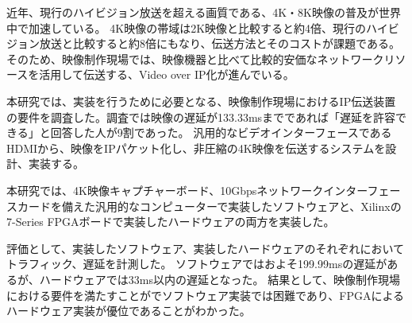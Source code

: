 
\begin{jabstract}

近年、現行のハイビジョン放送を超える画質である、4K・8K映像の普及が世界中で加速している。
4K映像の帯域は2K映像と比較すると約4倍、現行のハイビジョン放送と比較すると約8倍にもなり、伝送方法とそのコストが課題である。
そのため、映像制作現場では、映像機器と比べて比較的安価なネットワークリソースを活用して伝送する、Video over IP化が進んでいる。

本研究では、実装を行うために必要となる、映像制作現場におけるIP伝送装置の要件を調査した。調査では映像の遅延が133.33msまでであれば「遅延を許容できる」と回答した人が9割であった。
汎用的なビデオインターフェースであるHDMIから、映像をIPパケット化し、非圧縮の4K映像を伝送するシステムを設計、実装する。

本研究では、4K映像キャプチャーボード、10Gbpsネットワークインターフェースカードを備えた汎用的なコンピューターで実装したソフトウェアと、Xilinxの7-Series FPGAボードで実装したハードウェアの両方を実装した。

評価として、実装したソフトウェア、実装したハードウェアのそれぞれにおいてトラフィック、遅延を計測した。
ソフトウェアではおよそ199.99msの遅延があるが、ハードウェアでは33ms以内の遅延となった。
結果として、映像制作現場における要件を満たすことがでソフトウェア実装では困難であり、FPGAによるハードウェア実装が優位であることがわかった。

\end{jabstract}


